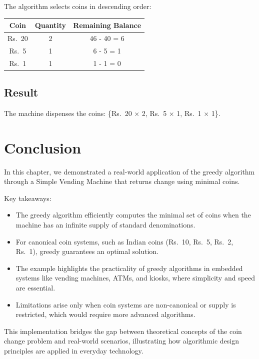 \documentclass[12pt,a4paper]{report}
\begin{document}
The algorithm selects coins in descending order:

\begin{center}
\begin{tabular}{c c c}
\hline
Coin & Quantity & Remaining Balance \\
\hline
Rs.~20 & 2 & 46 - 40 = 6 \\
Rs.~5 & 1 & 6 - 5 = 1 \\
Rs.~1 & 1 & 1 - 1 = 0 \\
\hline
\end{tabular}
\end{center}

\subsection{Result}
The machine dispenses the coins: \{Rs.~20 × 2, Rs.~5 × 1, Rs.~1 × 1\}.  

\section{Conclusion}
In this chapter, we demonstrated a real-world application of the greedy algorithm through a Simple Vending Machine that returns change using minimal coins.  

Key takeaways:
\begin{itemize}
    \item The greedy algorithm efficiently computes the minimal set of coins when the machine has an infinite supply of standard denominations.
    \item For canonical coin systems, such as Indian coins (Rs.~10, Rs.~5, Rs.~2, Rs.~1), greedy guarantees an optimal solution.
    \item The example highlights the practicality of greedy algorithms in embedded systems like vending machines, ATMs, and kiosks, where simplicity and speed are essential.
    \item Limitations arise only when coin systems are non-canonical or supply is restricted, which would require more advanced algorithms.
\end{itemize}

This implementation bridges the gap between theoretical concepts of the coin change problem and real-world scenarios, illustrating how algorithmic design principles are applied in everyday technology.

\end{document}
